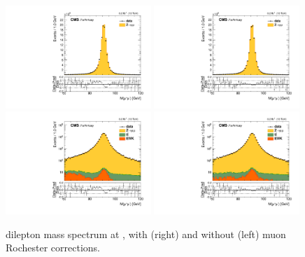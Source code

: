 \begin{figure}[htbp]
\centering
\includegraphics[width=0.49\textwidth]{plots/LepScaleSmear/plotZmm13TeV_noCorr/zmm.pdf}
\includegraphics[width=0.49\textwidth]{plots/LepScaleSmear/plotZmm13TeV_corr/zmm.pdf}
\\
\includegraphics[width=0.49\textwidth]{plots/LepScaleSmear/plotZmm13TeV_noCorr/zmmlog.pdf}
\includegraphics[width=0.49\textwidth]{plots/LepScaleSmear/plotZmm13TeV_corr/zmmlog.pdf}
\caption{\zmm dilepton mass spectrum at \serah, with (right) and without (left) muon Rochester corrections.}
\label{fig:lepscale:zmm:13}
\end{figure}